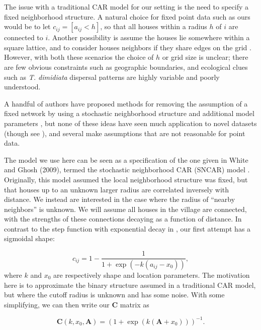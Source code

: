 \documentclass{scrartcl}
\newcommand{\mat}[1]{\bm{#1}}
\begin{document}
The issue with a traditional CAR model for our setting is the need to
specify a fixed neighborhood structure. A natural choice for fixed
point data such as ours would be to let $c_{ij} = [a_{ij} < h]$, so
that all houses within a radius $h$ of $i$ are connected to
$i$. Another possibility is assume the houses lie somewhere within a
square lattice, and to consider houses neighbors if they share edges
on the grid \cite{Paciorek2013}. However, with both these scenarios
the choice of $h$ or grid size is unclear; there are few obvious
constraints such as geographic boundaries, and ecological clues such
as \textit{T. dimidiata} dispersal patterns are highly variable and
poorly understood.

A handful of authors have proposed methods for removing the assumption
of a fixed network by using a stochastic neighborhood structure and
additional model parameters \cite{Gao2019, Rodrigues2012}, but none of
these ideas have seen much application to novel datasets (though see
\cite{Whittle2020}), and several make assumptions that are not
reasonable for point data.

The model we use here can be seen as a specification of the one given
in White and Ghosh (2009), termed the stochastic neighborhood CAR
(SNCAR) model \cite{White2009}. Originally, this model assumed the
local neighborhood structure was fixed, but that houses up to an
unknown larger radius are correlated inversely with distance. We
instead are interested in the case where the radius of ``nearby
neighbors'' is unknown. We will assume all houses in the village are
connected, with the strengths of these connections decaying as a
function of distance. In contrast to the step function with
exponential decay in \cite{White2009}, our first attempt has a
sigmoidal shape:

\begin{equation}
  \label{eq:decay-func}
  c_{ij} = 1 - \frac{1}{1 + \exp(-k (a_{ij} - x_0))},
\end{equation}
where $k$ and $x_0$ are respectively shape and location
parameters. The motivation here is to approximate the binary structure
assumed in a traditional CAR model, but where the cutoff radius is
unknown and has some noise. With some simplifying, we can then write
our $\mat{C}$ matrix as

\begin{equation}
  \label{eq:decay-mat1}
  \mat{C}(k, x_0, \mat{A}) = (1 + \exp(k (\mat{A} + x_0)))^{-1}.
\end{equation}
\end{document}
